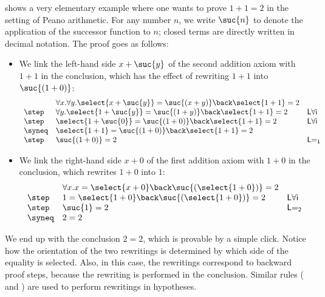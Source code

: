  shows a very elementary example where one wants to
prove $1+1=2$ in the setting of Peano arithmetic. For any number $n$, we write
$\suc{n}$ to denote the application of the successor function to $n$; closed
terms are directly written in decimal notation. The proof goes as
follows:
\begin{itemize}
  \item We link the left-hand side $x + \suc{y}$ of the second addition axiom with $1 + 1$ in the conclusion, which has the effect of rewriting $1 + 1$ into $\suc{(1 + 0)}$:
    $$
      \begin{array}{lll}
        & \forall x. \forall y. \select{x + \suc{y}} = \suc{(x + y)} \back \select{1 + 1} = 2 & \\
        \step & \forall y. \select{1 + \suc{y}} = \suc{(1 + y)} \back \select{1 + 1} = 2 &\mathsf{L\forall i} \\
        \step & \select{1 + \suc{0}} = \suc{(1 + 0)} \back \select{1 + 1} = 2 &\mathsf{L\forall i} \\
        \syneq & \select{1 + 1} = \suc{(1 + 0)} \back \select{1 + 1} = 2 & \\
        \step & \suc{(1 + 0)} = 2 &\mathsf{L{=}_1}
      \end{array}
    $$
  \item We link the right-hand side $x + 0$ of the first addition axiom with $1 + 0$ in the conclusion, which rewrites $1 + 0$ into $1$:
    $$
      \begin{array}{lll}
        & \forall x. x = \select{x + 0} \back \suc{(\select{1 + 0})} = 2 & \\
        \step & 1 = \select{1 + 0} \back \suc{(\select{1 + 0})} = 2 &\mathsf{L\forall i} \\
        \step & \suc{1} = 2 &\mathsf{L{=}_2} \\
        \syneq & 2 = 2 &
      \end{array}
    $$
\end{itemize}

We end up with the conclusion $2 = 2$, which is provable by a simple click.
Notice how the orientation of the two rewritings is determined by which side of
the equality is selected. Also, in this case, the rewritings
correspond to backward proof steps, because the rewriting is performed
in the conclusion. Similar rules ( and ) are
used to perform rewritings in hypotheses.


